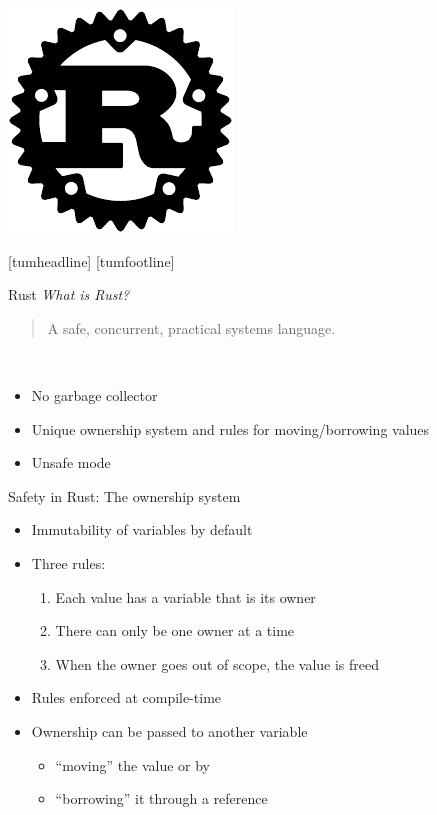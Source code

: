 \documentclass[NET,english,aspectratio=169,notitleframe]{tumbeamer}
\begin{document}
\begin{frame}{}
\centering\includegraphics[height=0.87\textheight]{pics/rust}
\end{frame}
[tumheadline]
[tumfootline]

\begin{frame}{Rust}
\emph{What is Rust?}\\
\begin{quote}
A safe, concurrent, practical systems language.
\end{quote}\\
\begin{itemize}
\item No garbage collector
\item Unique ownership system and rules for moving/borrowing values
\item Unsafe mode
\end{itemize}
\end{frame}

\begin{frame}{Safety in Rust: The ownership system}
\begin{itemize}
\item Immutability of variables by default
\item Three rules:
\begin{enumerate}
\item Each value has a variable that is its owner
\item There can only be one owner at a time
\item When the owner goes out of scope, the value is freed
\end{enumerate}
\item Rules enforced at compile-time
\item Ownership can be passed to another variable%
\begin{itemize}
\item ``moving'' the value or by
\item ``borrowing'' it through a reference
\end{itemize}
\end{itemize}
\end{frame}
\end{document}

